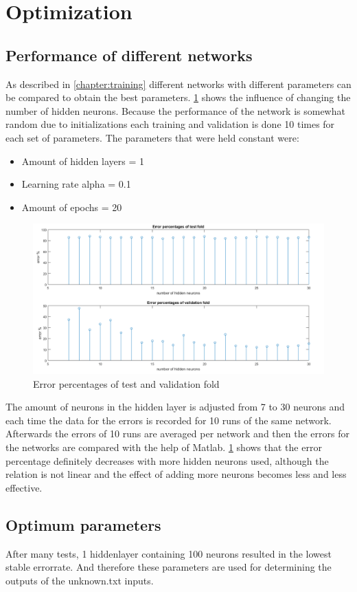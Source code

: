 \section{Optimization} \label {chapter:optimization}

\subsection{Performance of different networks}
As described in \cref{chapter:training} different networks with different parameters can be compared to obtain the best parameters. \cref{test_val_error} shows the influence of changing the number of hidden neurons. Because the performance of the network is somewhat random due to initializations each training and validation is done 10 times for each set of parameters. The parameters that were held constant were:

\begin{itemize}
\item Amount of hidden layers = 1
\item Learning rate alpha = 0.1
\item Amount of epochs = 20
\end{itemize}

\begin{figure}[!h]
\begin{center}
\includegraphics[width=16cm]{testresults/errorpercentages.png}
\caption{Error percentages of test and validation fold }
\label{test_val_error}
\end{center}
\end{figure}
\FloatBarrier

The amount of neurons in the hidden layer is adjusted from 7 to 30 neurons and each time the data for the errors is recorded for 10 runs of the same network. Afterwards the errors of 10 runs are averaged per network and then the errors for the networks are compared with the help of Matlab. \cref{test_val_error} shows that the error percentage definitely decreases with more hidden neurons used, although the relation is not linear and the effect of adding more neurons becomes less and less effective.

\subsection{Optimum parameters}
After many tests, 1 hiddenlayer containing 100 neurons resulted in the lowest stable errorrate. And therefore these parameters are used for determining the outputs of the unknown.txt inputs.


